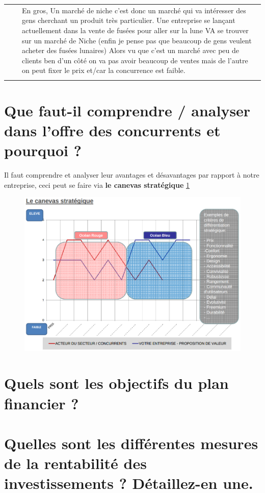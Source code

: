 \documentclass{article}
\begin{document}
\begin{tabular}{|rcl|}
				 &  & \multicolumn{1}{p{.8\textwidth}|}{En gros, Un marché de niche c'est donc un marché qui va intéresser des gens cherchant un produit très particulier. Une entreprise se lançant actuellement dans la vente de fusées pour aller sur la lune VA se trouver sur un marché de Niche (enfin je pense pas que beaucoup de gens veulent acheter des fusées lunaires) Alors vu que c'est un marché avec peu de clients ben d'un côté on va pas avoir beaucoup de ventes mais de l'autre on peut fixer le prix et/car la concurrence est faible.}\\
&&\\
\hline
\end{tabular}
\section{Que faut-il comprendre / analyser dans l’offre des concurrents et pourquoi ?} %
Il faut comprendre et analyser leur avantages et désavantages par rapport à notre entreprise, ceci peut se faire via \textbf{le canevas stratégique} \ref{fig:canevasStrategique}
\begin{figure}[H]
	\centering
	\includegraphics[width=14cm]{canevasStrategique.png}
	\label{fig:canevasStrategique}
\end{figure}
\section{Quels sont les objectifs du plan financier ?} %


\section{Quelles sont les différentes mesures de la rentabilité des investissements ? Détaillez-en une.}
\end{document}
